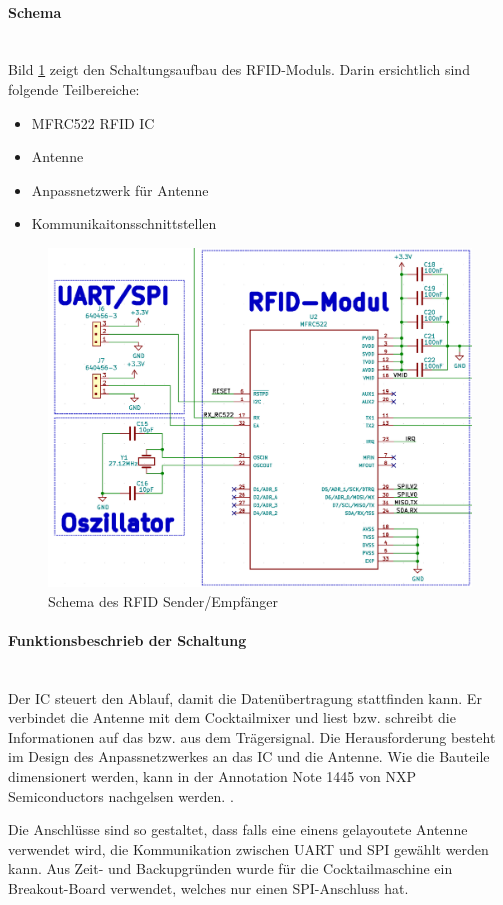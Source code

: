\paragraph{Schema}\mbox{}\\

Bild \ref{fig:Schema_RFID} zeigt den Schaltungsaufbau des RFID-Moduls. Darin ersichtlich sind folgende Teilbereiche:

\begin{itemize}
\item MFRC522 RFID IC
\item Antenne
\item Anpassnetzwerk für Antenne
\item Kommunikaitonsschnittstellen
\end{itemize}

\begin{figure}[!h]
\center
\includegraphics[width = 0.6 \textwidth]{graphics/Schema_RFID}
\caption{Schema des RFID Sender/Empfänger}
\label{fig:Schema_RFID}
\end{figure}

\paragraph{Funktionsbeschrieb der Schaltung}\mbox{}\\

Der IC steuert den Ablauf, damit die Datenübertragung stattfinden kann. Er verbindet die Antenne mit dem Cocktailmixer und liest bzw. schreibt die Informationen auf das bzw. aus dem Trägersignal. Die Herausforderung besteht im Design des Anpassnetzwerkes an das IC und die Antenne. Wie die Bauteile dimensionert werden, kann in der Annotation Note 1445 von NXP Semiconductors nachgelsen werden. \cite{nxp_bv_2010_antenna_2010}.

Die Anschlüsse sind so gestaltet, dass falls eine einens gelayoutete Antenne verwendet wird, die Kommunikation zwischen UART und SPI gewählt werden kann. Aus Zeit- und Backupgründen wurde für die Cocktailmaschine ein Breakout-Board verwendet, welches nur einen SPI-Anschluss hat.
